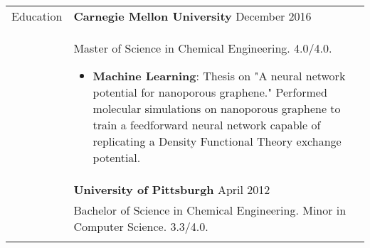 \documentclass[11pt]{article}
\begin{document}
\begin{tabular}[t]{@{}p{1.05in} @{}p{6.00in}}

{Education}
&
\textbf{Carnegie Mellon University} \hfill December 2016 \\ &
Master of Science in Chemical Engineering. 4.0/4.0. 
\begin{itemize}
    \item \textbf{Machine Learning}: Thesis on "A neural network potential for nanoporous graphene." Performed molecular simulations on nanoporous graphene to train a feedforward neural network capable of replicating a Density Functional Theory exchange potential.
\end{itemize}
\\
&
\textbf{University of Pittsburgh} \hfill April 2012 \\ &
Bachelor of Science in Chemical Engineering. Minor in Computer Science. 3.3/4.0. 
\vspace{0.5\baselineskip}
\\
\\

\end{tabular}
\end{document}

